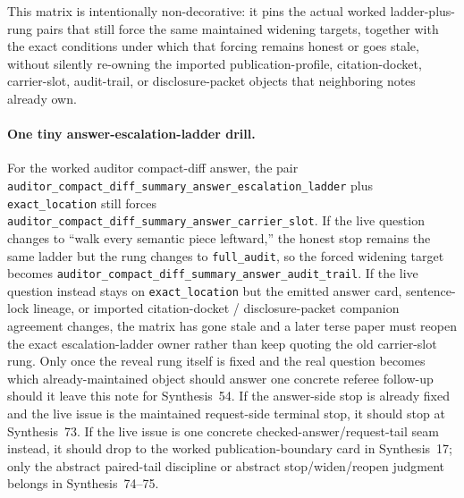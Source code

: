 \documentclass[11pt]{article}
\begin{document}
This matrix is intentionally non-decorative: it pins the actual worked ladder-plus-rung pairs that still force the same maintained widening targets, together with the exact conditions under which that forcing remains honest or goes stale, without silently re-owning the imported publication-profile, citation-docket, carrier-slot, audit-trail, or disclosure-packet objects that neighboring notes already own.\cite{series:workedexample}

\paragraph{One tiny answer-escalation-ladder drill.}
For the worked auditor compact-diff answer, the pair \nolinkurl{auditor_compact_diff_summary_answer_escalation_ladder} plus \nolinkurl{exact_location} still forces \nolinkurl{auditor_compact_diff_summary_answer_carrier_slot}. If the live question changes to ``walk every semantic piece leftward,'' the honest stop remains the same ladder but the rung changes to \nolinkurl{full_audit}, so the forced widening target becomes \nolinkurl{auditor_compact_diff_summary_answer_audit_trail}. If the live question instead stays on \nolinkurl{exact_location} but the emitted answer card, sentence-lock lineage, or imported citation-docket / disclosure-packet companion agreement changes, the matrix has gone stale and a later terse paper must reopen the exact escalation-ladder owner rather than keep quoting the old carrier-slot rung. Only once the reveal rung itself is fixed and the real question becomes which already-maintained object should answer one concrete referee follow-up should it leave this note for Synthesis~54. If the answer-side stop is already fixed and the live issue is the maintained request-side terminal stop, it should stop at Synthesis~73. If the live issue is one concrete checked-answer/request-tail seam instead, it should drop to the worked publication-boundary card in Synthesis~17; only the abstract paired-tail discipline or abstract stop/widen/reopen judgment belongs in Synthesis~74--75.\cite{series:workedexample}
\end{document}
